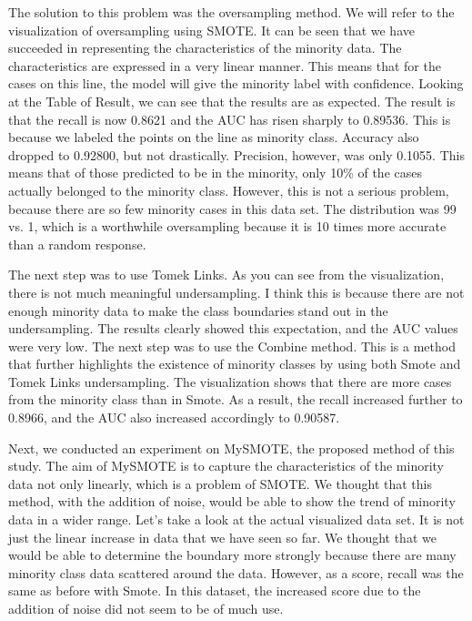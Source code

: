 The solution to this problem was the oversampling method. We will refer to the visualization of oversampling using SMOTE. It can be seen that we have succeeded in representing the characteristics of the minority data. The characteristics are expressed in a very linear manner. This means that for the cases on this line, the model will give the minority label with confidence. Looking at the Table of Result, we can see that the results are as expected. The result is that the recall is now 0.8621 and the AUC has risen sharply to 0.89536. This is because we labeled the points on the line as minority class. Accuracy also dropped to 0.92800, but not drastically. Precision, however, was only 0.1055. This means that of those predicted to be in the minority, only 10\% of the cases actually belonged to the minority class. However, this is not a serious problem, because there are so few minority cases in this data set. The distribution was 99 vs. 1, which is a worthwhile oversampling because it is 10 times more accurate than a random response. 

The next step was to use Tomek Links. As you can see from the visualization, there is not much meaningful undersampling. I think this is because there are not enough minority data to make the class boundaries stand out in the undersampling. The results clearly showed this expectation, and the AUC values were very low. The next step was to use the Combine method. This is a method that further highlights the existence of minority classes by using both Smote and Tomek Links undersampling. The visualization shows that there are more cases from the minority class than in Smote. As a result, the recall increased further to 0.8966, and the AUC also increased accordingly to 0.90587.

Next, we conducted an experiment on MySMOTE, the proposed method of this study. The aim of MySMOTE is to capture the characteristics of the minority data not only linearly, which is a problem of SMOTE. We thought that this method, with the addition of noise, would be able to show the trend of minority data in a wider range. Let's take a look at the actual visualized data set. It is not just the linear increase in data that we have seen so far. We thought that we would be able to determine the boundary more strongly because there are many minority class data scattered around the data. However, as a score, recall was the same as before with Smote. In this dataset, the increased score due to the addition of noise did not seem to be of much use.

